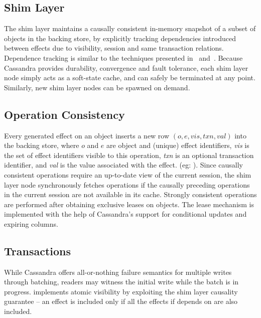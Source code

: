 
\subsection{Shim Layer}

The shim layer maintains a causally consistent in-memory snapshot of a
subset of objects in the backing store, by explicitly tracking dependencies
introduced between effects due to visibility, session and same transaction
relations.  Dependence tracking is similar to the techniques presented
in~\cite{BoltOn} and~\cite{Eiger}. Because Cassandra provides durability,
convergence and fault tolerance, each shim layer node simply acts as a
soft-state cache, and can safely be terminated at any point. Similarly, new
shim layer nodes can be spawned on demand.

\subsection{Operation Consistency}

Every generated effect on an object inserts a new row
$(o,e,\mathit{vis},\mathit{txn},\mathit{val})$ into the backing store, where
$o$ and $e$ are object and (unique) effect identifiers, \emph{vis} is the
set of effect identifiers visible to this operation, \emph{txn} is an
optional transaction identifier, and \emph{val} is the value associated with the
effect. (eg: ).  Since causally consistent operations require an
up-to-date view of the current session, the shim layer node synchronously
fetches operations if the causally preceding operations in the current
session are not available in its cache.  Strongly consistent operations are
performed after obtaining exclusive leases on objects. The lease mechanism
is implemented with the help of Cassandra's support for conditional updates
and expiring columns.

\subsection{Transactions}

While Cassandra offers all-or-nothing failure semantics for multiple writes
through batching, readers may witness the initial write while the batch is
in progress. \name implements atomic visibility by exploiting the shim layer
causality guarantee -- an effect is included only if all the effects if
depends on are also included.

